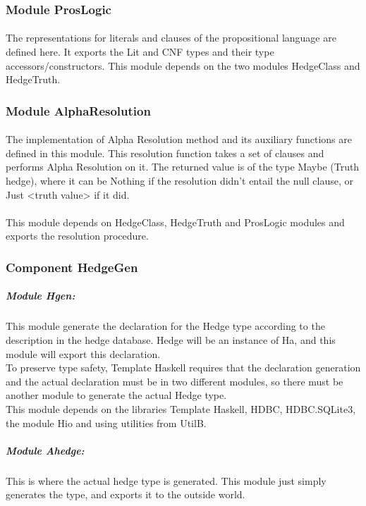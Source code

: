 \documentclass[../gr-final.tex]{subfiles}
\begin{document}
\subsubsection{Module ProsLogic}

\paragraph{}The representations for literals and clauses of the propositional language are defined here. It exports the Lit and CNF types and their type accessors/constructors. This module depends on the two modules HedgeClass and HedgeTruth.


\subsubsection{Module AlphaResolution}

\paragraph{}The implementation of Alpha Resolution method and its auxiliary functions are defined in this module. This resolution function takes a set of clauses and performs Alpha Resolution on it. The returned value is of the type Maybe (Truth hedge), where it can be Nothing if the resolution didn't entail the null clause, or Just <truth value> if it did.\\

\paragraph{}This module depends on HedgeClass, HedgeTruth and ProsLogic modules and exports the resolution procedure.

\subsubsection{Component HedgeGen}

\subparagraph{Module Hgen:} This module generate the declaration for the Hedge type
according to the description in the hedge database. Hedge will be an
instance of Ha, and this module will export this declaration.\\
To preserve type safety, Template Haskell requires that the declaration
generation and the actual declaration must be in two different
modules, so there must be another module to generate the actual Hedge type.\\
This module depends on the libraries Template Haskell, HDBC,
HDBC.SQLite3, the module Hio and using utilities from UtilB.\\
\subparagraph{Module Ahedge:} This is where the actual hedge type is
generated. This module just simply generates the type, and exports it
to the outside world.
\end{document}

